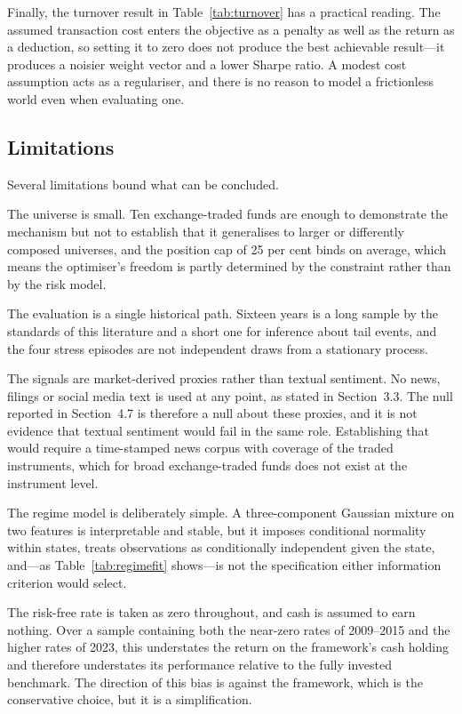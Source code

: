 Finally, the turnover result in Table~\ref{tab:turnover} has a practical reading. The assumed
transaction cost enters the objective as a penalty as well as the return as a
deduction, so setting it to zero does not produce the best achievable result---it
produces a noisier weight vector and a lower Sharpe ratio. A modest cost assumption acts
as a regulariser, and there is no reason to model a frictionless world even when
evaluating one.

\subsection{Limitations}

Several limitations bound what can be concluded.

The universe is small. Ten exchange-traded funds are enough to demonstrate the
mechanism but not to establish that it generalises to larger or differently composed
universes, and the position cap of 25 per cent binds on average, which means the
optimiser's freedom is partly determined by the constraint rather than by the risk
model.

The evaluation is a single historical path. Sixteen years is a long sample by the
standards of this literature and a short one for inference about tail events, and the
four stress episodes are not independent draws from a stationary process.

The signals are market-derived proxies rather than textual sentiment. No news, filings
or social media text is used at any point, as stated in Section~3.3. The null reported
in Section~4.7 is therefore a null about these proxies, and it is not evidence that
textual sentiment would fail in the same role. Establishing that would require a
time-stamped news corpus with coverage of the traded instruments, which for broad
exchange-traded funds does not exist at the instrument level.

The regime model is deliberately simple. A three-component Gaussian mixture on two
features is interpretable and stable, but it imposes conditional normality within
states, treats observations as conditionally independent given the state, and---as
Table~\ref{tab:regimefit} shows---is not the specification either information criterion would select.

The risk-free rate is taken as zero throughout, and cash is assumed to earn nothing.
Over a sample containing both the near-zero rates of 2009--2015 and the higher rates of
2023, this understates the return on the framework's cash holding and therefore
understates its performance relative to the fully invested benchmark. The direction of
this bias is against the framework, which is the conservative choice, but it is a
simplification.

